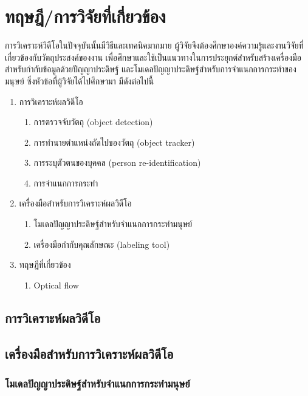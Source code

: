 \clearpage
\chapter{ทฤษฎี/การวิจัยที่เกี่ยวข้อง}
การวิเคราะห์วิดีโอในปัจจุบันนั้นมีวิธีและเทคนิคมากมาย ผู้วิจัยจึงต้องศึกษาองค์ความรู้และงานวิจัยที่เกี่ยวข้องกับวัตถุประสงค์ของงาน 
เพื่อศึกษาและใช้เป็นแนวทางในการประยุกต์สำหรับสร้างเครื่องมือสำหรับกำกับข้อมูลด้วยปัญญาประดิษฐ์ และโมเดลปัญญาประดิษฐ์สำหรับการจำแนกการกระทำของมนุษย์ 
ซึ่งหัวข้อที่ผู้วิจัยได้ไปศึกษามา มีดังต่อไปนี้
\begin{enumerate}
	\setlength\itemsep{-0.25em}
	\item การวิเคราะห์ผลวิดีโอ
	\begin{enumerate}	
		\item การตรวจจับวัตถุ (object detection)
		\item การทำนายตำแหน่งถัดไปของวัตถุ (object tracker)
		\item การระบุตัวตนของบุคคล (person re-identification)
		\item การจำแนกการกระทำ
	\end{enumerate}
	\setlength\itemsep{-0.25em}
	\item เครื่องมือสำหรับการวิเคราะห์ผลวิดีโอ
	\begin{enumerate}	
		\item โมเดลปัญญาประดิษฐ์สำหรับจำแนกการกระทำมนุษย์
		\item เครื่องมือกำกับคุณลักษณะ (labeling tool)
	\end{enumerate}
	\item ทฤษฎีที่เกี่ยวข้อง
	\begin{enumerate}	
		\item Optical flow
	\end{enumerate}
\end{enumerate}

\section{การวิเคราะห์ผลวิดีโอ}


\section{เครื่องมือสำหรับการวิเคราะห์ผลวิดีโอ}
\subsection{โมเดลปัญญาประดิษฐ์สำหรับจำแนกการกระทำมนุษย์}

